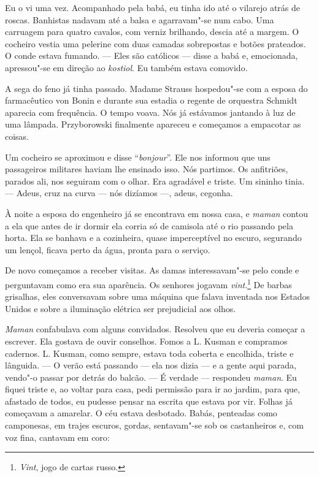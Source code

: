 Eu o vi uma vez. Acompanhado pela babá, eu tinha ido até o vilarejo
atrás de roscas. Banhistas nadavam até a balsa e agarravam"-se num cabo.
Uma carruagem para quatro cavalos, com verniz brilhando, descia até a
margem. O cocheiro vestia uma pelerine com duas camadas sobrepostas e
botões prateados. O conde estava fumando. --- Eles são católicos ---
disse a babá e, emocionada, apressou"-se em direção ao \emph{kostiol}. Eu
também estava comovido.

A sega do feno já tinha passado. Madame Strauss hospedou"-se com a esposa
do farmacêutico von Bonin e durante sua estadia o regente de orquestra
Schmidt aparecia com frequência. O tempo voava. Nós já estávamos
jantando à luz de uma lâmpada. Przyborowski finalmente apareceu e
começamos a empacotar as coisas.

Um cocheiro se aproximou e disse ``\emph{bonjour}''. Ele nos informou
que uns passageiros militares haviam lhe ensinado isso. Nós partimos. Os
anfitriões, parados ali, nos seguiram com o olhar. Era agradável e
triste. Um sininho tinia. --- Adeus, cruz na curva --- nós dizíamos ---,
adeus, cegonha.

À noite a esposa do engenheiro já se encontrava em nossa casa, e
\emph{maman} contou a ela que antes de ir dormir ela corria só de
camisola até o rio passando pela horta. Ela se banhava e a cozinheira,
quase imperceptível no escuro, segurando um lençol, ficava perto da
água, pronta para o serviço.

De novo começamos a receber visitas. As damas interessavam"-se pelo conde
e perguntavam como era sua aparência. Os senhores jogavam
\emph{vint}.\footnote{\emph{Vint}, jogo de cartas russo.} De barbas
grisalhas, eles conversavam sobre uma máquina que falava inventada nos
Estados Unidos e sobre a iluminação elétrica ser prejudicial aos olhos.

\emph{Maman} confabulava com alguns convidados. Resolveu que eu deveria
começar a escrever. Ela gostava de ouvir conselhos. Fomos a L. Kusman e
compramos cadernos. L. Kusman, como sempre, estava toda coberta e
encolhida, triste e lânguida. --- O verão está passando --- ela nos
dizia --- e a gente aqui parada, vendo"-o passar por detrás do balcão.
--- É verdade --- respondeu \emph{maman}. Eu fiquei triste e, ao voltar
para casa, pedi permissão para ir ao jardim, para que, afastado de
todos, eu pudesse pensar na escrita que estava por vir. Folhas já
começavam a amarelar. O céu estava desbotado. Babás, penteadas como
camponesas, em trajes escuros, gordas, sentavam"-se sob os castanheiros
e, com voz fina, cantavam em coro:

